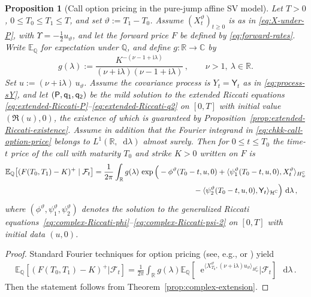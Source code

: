 \documentclass[10pt,a4paper,reqno]{amsart}
\newcommand*\D{\mathop{}\!\mathrm{d}}
\newcommand*\E{\mathop{}\!\mathrm{e}}
\numberwithin{equation}{section}
\newtheorem{proposition}[theorem]{Proposition}
\theoremstyle{plain}
\theoremstyle{definition}
\theoremstyle{example}
\renewcommand{\MR}{\mathbb{R}}
\newcommand{\R}{\MR}
\begin{document}
\begin{proposition}[Call option pricing in the pure-jump affine SV model]\label{prop:price-option}
Let $T>0$, $0\le T_{0}\le T_{1}\le T$, and set $\vartheta := T_{1}-T_{0}$.
Assume $(X^{\vartheta}_t)_{t\ge 0}$ is as in \eqref{eq:X-under-P}, with $\Upsilon = -\tfrac{1}{2}u_\vartheta$,
and let the forward price $F$ be defined by \eqref{eq:forward-rates}.
Write $\mathbb{E}_{\mathbb{Q}}$ for expectation under $\mathbb{Q}$, and define $g:\mathbb{R}\to\mathbb{C}$ by
\begin{equation}\label{eq:chkk-fourrier-payoff}
  g(\lambda) := \frac{K^{-(\nu -1+\mathrm{i}\lambda)}}{(\nu +\mathrm{i}\lambda)(\nu-1 +\mathrm{i}\lambda)}\,,
  \qquad \nu>1,\ \lambda\in\mathbb{R}.
\end{equation}
Set $u := (\nu + \mathrm{i}\lambda)\,u_{\vartheta}$. Assume the covariance process is $Y_t=\mathsf{Y}_t$ as in \eqref{eq:process-sY}, and let $(\sf P, \sf q_1, \sf q_2)$ be the mild solution to the extended Riccati equations \eqref{eq:extended-Riccati-P}--\eqref{eq:extended-Riccati-q2} on $[0,T]$ with initial value $(\Re(u), 0)$, the existence of which is guaranteed by Proposition~\ref{prop:extended-Riccati-existence}.
Assume in addition that the Fourier integrand in \eqref{eq:chkk-call-option-price} belongs to $L^1(\mathbb R,\D\lambda)$ almost surely.
Then for $0\leq t\leq T_0$ the time-$t$ price of the call with maturity $T_0$ and strike $K>0$ written on $F$ is
\begin{align}\label{eq:chkk-call-option-price}
\mathbb{E}_{\mathbb{Q}}\big[(F(T_0,T_1)-K)^+ \mid \mathcal{F}_t\big]
= \frac{1}{2\pi}\int_{\mathbb{R}}
g(\lambda)\,
\exp\Big(
& -\phi^{\vartheta}(T_0-t,u,0)
+ \langle \psi_{1}^{\vartheta}(T_0-t,u,0), X_{t}^\vartheta\rangle_{H_w^{\mathbb{C}}} \nonumber\\
&\hspace{1.6cm}
- \langle \psi_{2}^{\vartheta}(T_0-t,u,0), \mathsf{Y}_{t}\rangle_{\mathcal{H}^{\mathbb{C}}}
\Big)\,\D\lambda\,,
\end{align}
where $(\phi^{\vartheta},\psi_1^{\vartheta},\psi_2^{\vartheta})$ denotes the solution to the generalized Riccati equations~\eqref{eq:complex-Riccati-phi}--\eqref{eq:complex-Riccati-psi-2} on $[0,T]$ with initial data $(u,0)$.
\end{proposition}
\begin{proof}
Standard Fourier techniques for option pricing (see, e.g., \cite{eberlein2010analysis} or \cite[Theorem 10.6]{filipovic2009term}) yield
\begin{align*}
\mathbb{E}_{\mathbb{Q}}[(F(T_0,T_1) -K)^+|\mathcal{F}_t] = \frac{1}{2\pi} \int_{\R}  g(\lambda)
\mathbb{E}_{\mathbb{Q}}[\E^{\langle X^\vartheta_{T_0}, (\nu+\mathrm{i}\lambda)u_{\vartheta}\rangle_{H_w^\mathbb{C}}}|\mathcal{F}_t] \, \D \lambda\,.
\end{align*}
Then the statement follows from Theorem~\ref{prop:complex-extension}.
\end{proof}
\end{document}
